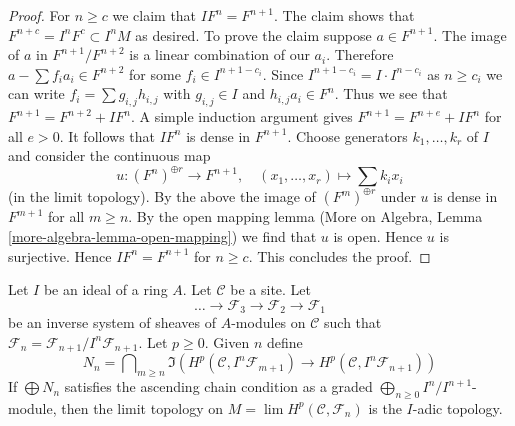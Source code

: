 \begin{proof}
\medskip\noindent
For $n \geq c$ we claim that $I F^n = F^{n + 1}$. The claim shows that
$F^{n + c} = I^nF^c \subset I^nM$ as desired. To prove the claim
suppose $a \in F^{n + 1}$. The image of
$a$ in $F^{n + 1}/F^{n + 2}$ is a linear combination
of our $a_i$. Therefore $a  - \sum f_i a_i \in F^{n + 2}$
for some $f_i \in I^{n + 1 - c_i}$. Since
$I^{n + 1 - c_i} = I \cdot I^{n - c_i}$ as $n \geq c_i$ we can write
$f_i = \sum g_{i, j} h_{i, j}$ with $g_{i, j} \in I$
and $h_{i, j}a_i \in F^n$. Thus we see that
$F^{n + 1} = F^{n + 2} + IF^n$.
A simple induction argument gives $F^{n + 1} = F^{n + e} + IF^n$
for all $e > 0$. It follows that $IF^n$ is dense in $F^{n + 1}$.
Choose generators $k_1, \ldots, k_r$ of $I$ and consider
the continuous map
$$
u : (F^n)^{\oplus r} \longrightarrow F^{n + 1},\quad
(x_1, \ldots, x_r) \mapsto \sum k_i x_i
$$
(in the limit topology).
By the above the image of $(F^m)^{\oplus r}$ under $u$ is dense in
$F^{m + 1}$ for all $m \geq n$. By the open mapping lemma
(More on Algebra, Lemma \ref{more-algebra-lemma-open-mapping}) we find
that $u$ is open. Hence $u$ is surjective. Hence $IF^n = F^{n + 1}$
for $n \geq c$. This concludes the proof.
\end{proof}

\begin{lemma}
\label{lemma-topology-I-adic-general-better}
Let $I$ be an ideal of a ring $A$. Let $\mathcal{C}$ be a site. Let
$$
\ldots \to \mathcal{F}_3 \to \mathcal{F}_2 \to \mathcal{F}_1
$$
be an inverse system of sheaves of $A$-modules on $\mathcal{C}$ such that
$\mathcal{F}_n = \mathcal{F}_{n + 1}/I^n\mathcal{F}_{n + 1}$.
Let $p \geq 0$. Given $n$ define
$$
N_n =
\bigcap\nolimits_{m \geq n}
\Im\left(
H^p(\mathcal{C}, I^n\mathcal{F}_{m + 1}) \to
H^p(\mathcal{C}, I^n\mathcal{F}_{n + 1})
\right)
$$
If $\bigoplus N_n$ satisfies the ascending chain condition as a graded
$\bigoplus_{n \geq 0} I^n/I^{n + 1}$-module, then
the limit topology on $M = \lim H^p(\mathcal{C}, \mathcal{F}_n)$
is the $I$-adic topology.
\end{lemma}

